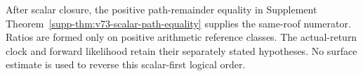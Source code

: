 \documentclass[11pt,reqno]{amsart}
\numberwithin{equation}{section}
\theoremstyle{definition}
\theoremstyle{remark}\newtheorem{remark}[theorem]{Remark}
\begin{document}
After scalar closure, the positive path-remainder equality in
Supplement Theorem~\ref{supp-thm:v73-scalar-path-equality} supplies
the same-roof numerator. Ratios are formed only on positive arithmetic
reference classes. The actual-return clock and forward likelihood
retain their separately stated hypotheses. No surface estimate is
used to reverse this scalar-first logical order.

\appendix

\begingroup
\small
\enlargethispage{2\baselineskip}

\endgroup
\end{document}
